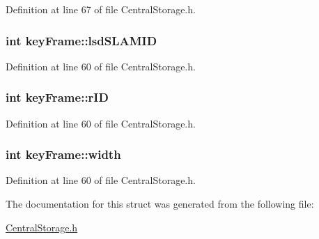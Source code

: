 \-Definition at line 67 of file \-Central\-Storage.\-h.

\hypertarget{structkeyFrame_a0cf94e5999249fd9697daba9202800fe}{
\subsubsection[{lsd\-S\-L\-A\-M\-I\-D}]{\setlength{\rightskip}{0pt plus 5cm}int {\bf key\-Frame\-::lsd\-S\-L\-A\-M\-I\-D}}}\label{structkeyFrame_a0cf94e5999249fd9697daba9202800fe}


\-Definition at line 60 of file \-Central\-Storage.\-h.

\hypertarget{structkeyFrame_a3d8de485d4a812bf9dd92298ab4e1664}{
\subsubsection[{r\-I\-D}]{\setlength{\rightskip}{0pt plus 5cm}int {\bf key\-Frame\-::r\-I\-D}}}\label{structkeyFrame_a3d8de485d4a812bf9dd92298ab4e1664}


\-Definition at line 60 of file \-Central\-Storage.\-h.

\hypertarget{structkeyFrame_a7c120296453059ee5b9ab853910e2c46}{
\subsubsection[{width}]{\setlength{\rightskip}{0pt plus 5cm}int {\bf key\-Frame\-::width}}}\label{structkeyFrame_a7c120296453059ee5b9ab853910e2c46}


\-Definition at line 60 of file \-Central\-Storage.\-h.



\-The documentation for this struct was generated from the following file\-:\begin{DoxyCompactItemize}
\item 
\hyperlink{CentralStorage_8h}{\-Central\-Storage.\-h}\end{DoxyCompactItemize}
